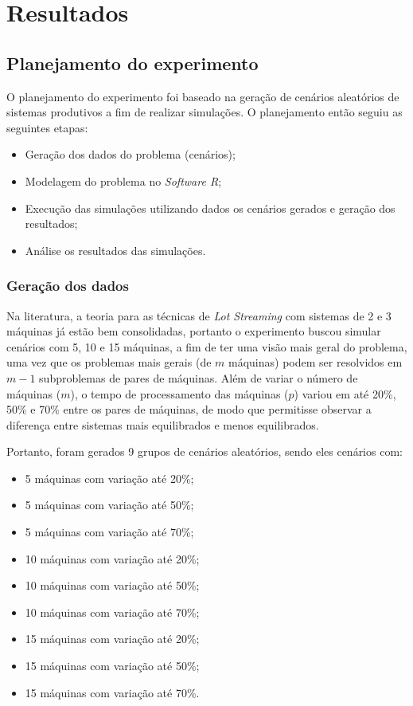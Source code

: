 \section{Resultados} \label{sec:result}
\subsection{Planejamento do experimento} \label{subsec:planexp}

O planejamento do experimento foi baseado na geração de cenários aleatórios de sistemas produtivos a fim de realizar simulações. O planejamento então seguiu as seguintes etapas:

\begin{itemize}
    \item Geração dos dados do problema (cenários);
    \item Modelagem do problema no \textit{Software R};
    \item Execução das simulações utilizando dados os cenários gerados e geração dos resultados;
    \item Análise os resultados das simulações.
\end{itemize}


    \subsubsection{Geração dos dados}
    
    Na literatura, a teoria para as técnicas de \textit{Lot Streaming} com sistemas de 2 e 3 máquinas já estão bem consolidadas, portanto o experimento buscou simular cenários com 5, 10 e 15 máquinas, a fim de ter uma visão mais geral do problema, uma vez que os problemas mais gerais (de $m$ máquinas) podem ser resolvidos em $m-1$ subproblemas de pares de máquinas. Além de variar o número de máquinas ($m$), o tempo de processamento das máquinas ($p$) variou em até 20\%, 50\% e 70\% entre os pares de máquinas, de modo que permitisse observar a diferença entre sistemas mais equilibrados e menos equilibrados. 
    
    Portanto, foram gerados 9 grupos de cenários aleatórios, sendo eles cenários com:
    \begin{itemize}
        \item 5 máquinas com variação até 20\%;
        \item 5 máquinas com variação até 50\%;
        \item 5 máquinas com variação até 70\%;
        \item 10 máquinas com variação até 20\%;
        \item 10 máquinas com variação até 50\%;
        \item 10 máquinas com variação até 70\%;
        \item 15 máquinas com variação até 20\%;
        \item 15 máquinas com variação até 50\%;
        \item 15 máquinas com variação até 70\%.
    \end{itemize}
    
